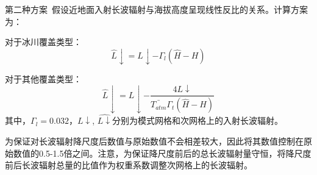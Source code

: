 \begin{enumerate}
第二种方案~\citet{Tricht2016}假设近地面入射长波辐射与海拔高度呈现线性反比的关系。计算方案为：

对于冰川覆盖类型：
\begin{equation}
\hat{L}↓=L↓-\Gamma_{l} \left(\hat{H}-H\right)       
\end{equation}

对于其他覆盖类型：
\begin{equation}
\hat{L}↓=L↓-\frac{4 L↓}{\bar{T_{atm}} \Gamma_{t} \left(\hat{H}-H\right)}      
\end{equation}
其中，$\Gamma_{l}=0.032$，$L↓$, $\hat{L↓}$分别为模式网格和次网格上的入射长波辐射。

为保证对长波辐射降尺度后数值与原始数值不会相差较大，因此将其数值控制在原始数值的0.5-1.5倍之间。注意，为保证降尺度前后的总长波辐射量守恒，将降尺度前后长波辐射总量的比值作为权重系数调整次网格上的长波辐射。

\end{enumerate}